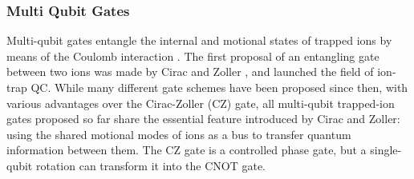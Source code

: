 \documentclass[%
reprint,
 amsmath,amssymb,
]{revtex4-1}
\begin{document}
    \subsubsection{Multi Qubit Gates}
    \label{Multiqubitgates}
Multi-qubit gates entangle the internal and motional states of trapped ions by means of the Coulomb interaction \cite{James2QGatesReview2000}.  The first proposal of an entangling gate between two ions was made by Cirac and Zoller \cite{CiracZollerGate}, and launched the field of ion-trap QC. While many different gate schemes have been proposed since then, with various advantages over the Cirac-Zoller (CZ) gate, all multi-qubit trapped-ion gates proposed so far share the essential feature introduced by Cirac and Zoller: using the shared motional modes of ions as a bus to transfer quantum information between them. The CZ gate is a controlled phase gate, but a single-qubit rotation can transform it into the CNOT gate.
\end{document}
